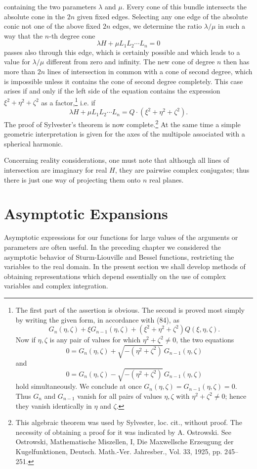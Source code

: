 containing the two parameters $\lambda$ and $\mu$. Every cone of this bundle intersects the absolute cone in the $2n$ given fixed edges. Selecting any one edge of the absolute conic not one of the above fixed $2n$ edges, we determine the ratio $\lambda/\mu$ in such a way that the $n$-th degree cone
\[
\lambda H+\mu L_1L_2\cdots L_n=0
\]
passes also through this edge, which is certainly possible and which leads to a value for $\lambda/\mu$ different from zero and infinity. The new cone of degree $n$ then has more than $2n$ lines of intersection in common with a cone of second degree, which is impossible unless it contains the cone of second degree completely. This case arises if and only if the left side of the equation contains the expression $\xi^2+\eta^2+\zeta^2$ as a factor,\footnote{The first part of the assertion is obvious. The second is proved most simply by writing the given form, in accordance with (84), as
\[
G_n(\eta,\zeta)+\xi G_{n-1}(\eta,\zeta)+(\xi^2+\eta^2+\zeta^2)Q(\xi,\eta,\zeta).
\]
Now if $\eta,\zeta$ is any pair of values for which $\eta^2+\zeta^2\ne0$, the two equations
\[
0=G_n(\eta,\zeta)+\sqrt{-(\eta^2+\zeta^2)}\,G_{n-1}(\eta,\zeta)
\]
and
\[
0=G_n(\eta,\zeta)-\sqrt{-(\eta^2+\zeta^2)}\,G_{n-1}(\eta,\zeta)
\]
hold simultaneously. We conclude at once $G_n(\eta,\zeta)=G_{n-1}(\eta,\zeta)=0$. Thus $G_n$ and $G_{n-1}$ vanish for all pairs of values $\eta,\zeta$ with $\eta^2+\zeta^2\ne0$; hence they vanish identically in $\eta$ and $\zeta$.} i.e. if
\[
\lambda H+\mu L_1L_2\cdots L_n=Q\cdot(\xi^2+\eta^2+\zeta^2).
\]
The proof of Sylvester's theorem is now complete.\footnote{This algebraic theorem was used by Sylvester, loc. cit., without proof. The necessity of obtaining a proof for it was indicated by A. Ostrowski. See Ostrowski, Mathematische Miszellen, I, Die Maxwellsche Erzeugung der Kugelfunktionen, Deutsch. Math.-Ver. Jahresber., Vol. 33, 1925, pp. 245--251.} At the same time a simple geometric interpretation is given for the axes of the multipole associated with a spherical harmonic.

Concerning reality considerations, one must note that although all lines of intersection are imaginary for real $H$, they are pairwise complex conjugates; thus there is just one way of projecting them onto $n$ real planes.

\section{Asymptotic Expansions}
Asymptotic expressions for our functions for large values of the arguments or parameters are often useful. In the preceding chapter we considered the asymptotic behavior of Sturm-Liouville and Bessel functions, restricting the variables to the real domain. In the present section we shall develop methods of obtaining representations which depend essentially on the use of complex variables and complex integration.

